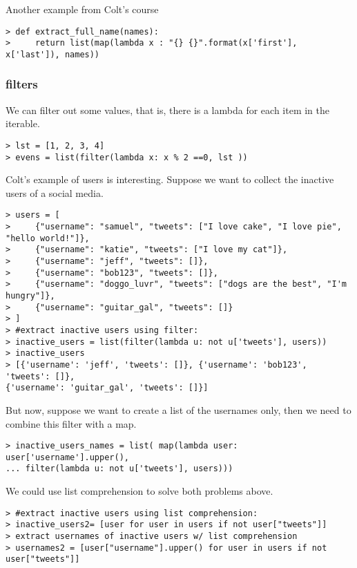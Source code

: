Another example from Colt's course
\begin{verbatim}
> def extract_full_name(names):
>     return list(map(lambda x : "{} {}".format(x['first'], x['last']), names))
\end{verbatim}

\subsubsection{filters}

We can filter out some values, that is, there is a lambda for each item in the iterable. 
\begin{verbatim}
> lst = [1, 2, 3, 4]
> evens = list(filter(lambda x: x % 2 ==0, lst ))
\end{verbatim}

Colt's example of users is interesting. Suppose we want to collect the inactive users of a social media. 
\begin{verbatim}
> users = [
>     {"username": "samuel", "tweets": ["I love cake", "I love pie", "hello world!"]},
>     {"username": "katie", "tweets": ["I love my cat"]},
>     {"username": "jeff", "tweets": []},
>     {"username": "bob123", "tweets": []},
>     {"username": "doggo_luvr", "tweets": ["dogs are the best", "I'm hungry"]},
>     {"username": "guitar_gal", "tweets": []}
> ]
> #extract inactive users using filter:
> inactive_users = list(filter(lambda u: not u['tweets'], users))
> inactive_users
> [{'username': 'jeff', 'tweets': []}, {'username': 'bob123', 'tweets': []}, 
{'username': 'guitar_gal', 'tweets': []}]
\end{verbatim}

But now, suppose we want to create a list of the usernames only, then we need to combine this filter with a map. 
\begin{verbatim}
> inactive_users_names = list( map(lambda user: user['username'].upper(), 
... filter(lambda u: not u['tweets'], users)))
\end{verbatim}

We could use list comprehension to solve both problems above. 
\begin{verbatim}
> #extract inactive users using list comprehension:
> inactive_users2= [user for user in users if not user["tweets"]]
> extract usernames of inactive users w/ list comprehension
> usernames2 = [user["username"].upper() for user in users if not user["tweets"]]
\end{verbatim}



